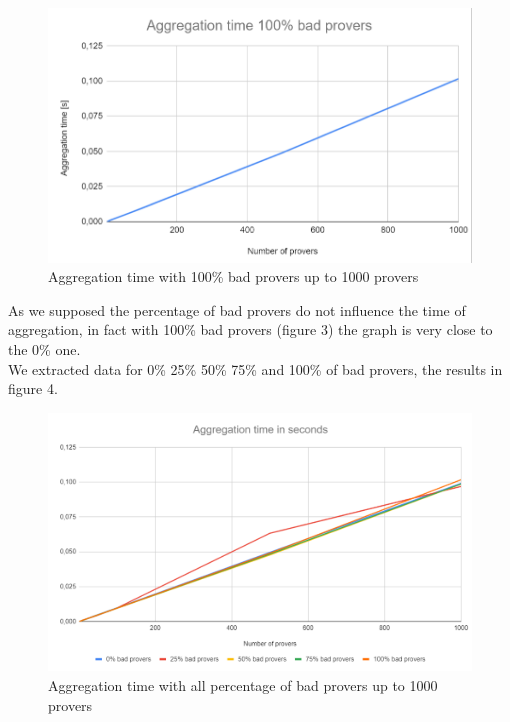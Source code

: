 \documentclass[10pt, a4paper, twocolumn]{article} %
\begin{document}
\begin{figure}
	\includegraphics[width=\linewidth]{images/aggregation_100.png} %
	\caption{Aggregation time with 100\% bad provers up to 1000 provers} %
	\label{bear} %
\end{figure}

As we supposed the percentage of bad provers do not influence the time of aggregation, in fact with 100\% bad provers (figure 3) the graph is very close to the 0\% one.\\ 
We extracted data for 0\% 25\% 50\% 75\% and 100\% of bad provers, the results in figure 4.\\
\begin{figure}
	\includegraphics[width=\linewidth]{images/aggregation_comparison.png} %
	\caption{Aggregation time with all percentage of bad provers up to 1000 provers} %
	\label{bear} %
\end{figure}
\end{document}
